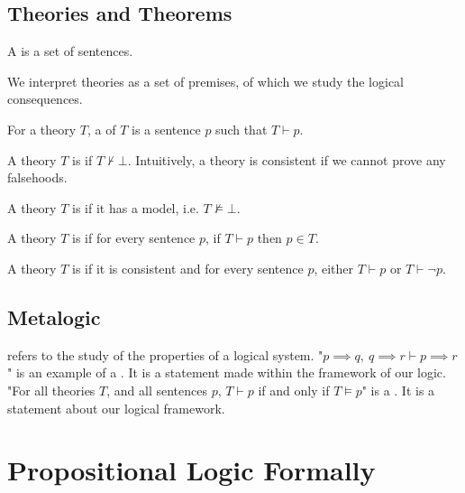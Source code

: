 \documentclass[11pt]{article}
\begin{document}
\subsection{Theories and Theorems}
\begin{defi}
    [Theory]
    A  is a set of sentences.
\end{defi}
We interpret theories as a set of premises, of which we study the logical consequences.
\begin{defi}
    [Theorem]
    For a theory $T$, a  of $T$ is a sentence $p$ such that $T \vdash p$.
\end{defi}
\begin{defi}
    A theory $T$ is  if $T \not\vdash \bot$.
    Intuitively, a theory is consistent if we cannot prove any falsehoods.
\end{defi}
\begin{defi}
    A theory $T$ is  if it has a model, i.e. $T \not\vDash \bot$.
\end{defi}
\begin{defi}
    A theory $T$ is  if for every sentence $p$, if $T \vdash p$ then $p \in T$.
\end{defi}
\begin{defi}
    A theory $T$ is  if it is consistent and for every sentence $p$, either $T \vdash p$ or $T \vdash \neg p$.
\end{defi}
\subsection{Metalogic}
\label{sec:informalMetalogic}
 refers to the study of the properties of a logical system.
\mypar
"$p \implies q, \ q \implies r \vdash p \implies r$" is an example of a . It is a statement made within the framework of our logic.
\mypar
"For all theories $T$, and all sentences $p$, $T \vdash p$ if and only if $T \vDash p$" is a . It is a statement about our logical framework.
\pagebreak
\section{Propositional Logic Formally}
\end{document}
